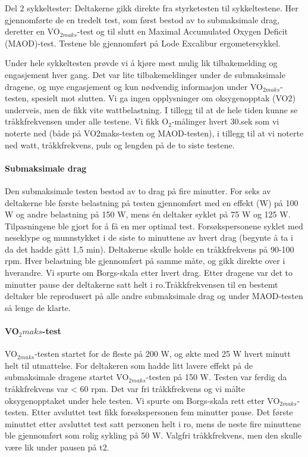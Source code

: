 \documentclass[
  letterpaper,
  DIV=11,
  numbers=noendperiod]{scrartcl}
\let\oldparagraph\paragraph
\renewcommand{\paragraph}[1]{\oldparagraph{#1}\mbox{}}
\begin{document}
Del 2 sykkeltester: Deltakerne gikk direkte fra styrketesten til
sykkeltestene. Her gjennomførte de en tredelt test, som først bestod av
to submaksimale drag, deretter en VO\(_{2maks}\)-test og til slutt en
Maximal Accumulated Oxygen Deficit (MAOD)-test. Testene ble gjennomført
på Lode Excalibur ergometersykkel.

Under hele sykkeltesten prøvde vi å kjøre mest mulig lik tilbakemelding
og engasjement hver gang. Det var lite tilbakemeldinger under de
submaksimale dragene, og mye engasjement og kun nødvendig informasjon
under VO\(_{2maks}\)-testen, spesielt mot slutten. Vi ga ingen
opplysninger om oksygenopptak (VO2) underveis, men de fikk vite
wattbelastning. I tillegg til at de hele tiden kunne se tråkkfrekvensen
under alle testene. Vi fikk O\(_2\)-målinger hvert 30.sek som vi noterte
ned (både på VO2maks-testen og MAOD-testen), i tillegg til at vi noterte
ned watt, tråkkfrekvens, puls og lengden på de to siste testene.

\hypertarget{submaksimale-drag}{%
\paragraph{Submaksimale drag}\label{submaksimale-drag}}

Den submaksimale testen bestod av to drag på fire minutter. For seks av
deltakerne ble første belastning på testen gjennomført med en effekt (W)
på 100 W og andre belastning på 150 W, mens én deltaker syklet på 75 W
og 125 W. Tilpasningene ble gjort for å få en mer optimal test.
Forsøkspersonene syklet med neseklype og munnstykket i de siste to
minuttene av hvert drag (begynte å ta i da det hadde gått 1,5 min).
Deltakerne skulle holde en tråkkfrekvens på 90-100 rpm. Hver belastning
ble gjennomført på samme måte, og gikk direkte over i hverandre. Vi
spurte om Borgs-skala etter hvert drag. Etter dragene var det to
minutter pause der deltakerne satt helt i ro.Tråkkfrekvensen til en
bestemt deltaker ble reprodusert på alle andre submaksimale drag og
under MAOD-testen så lenge de klarte.

\hypertarget{vo_2maks-test}{%
\paragraph{\texorpdfstring{VO\(_2maks\)-test}{VO\_2maks-test}}\label{vo_2maks-test}}

VO\(_{2maks}\)-testen startet for de fleste på 200 W, og økte med 25 W
hvert minutt helt til utmattelse. For deltakeren som hadde litt lavere
effekt på de submaksimale dragene startet VO\(_{2maks}\)-testen på 150
W. Testen var ferdig da tråkkfrekvens var \textless{} 60 rpm. Det var
fri tråkkfrekvens og vi målte oksygenopptaket under hele testen. Vi
spurte om Borgs-skala rett etter VO\(_{2maks}\)-testen. Etter avsluttet
test fikk forsøkspersonen fem minutter pause. Det første minuttet etter
avsluttet test satt personen helt i ro, mens de neste fire minuttene ble
gjennomført som rolig sykling på 50 W. Valgfri tråkkfrekvens, men den
skulle være lik under pausen på t2.
\end{document}
